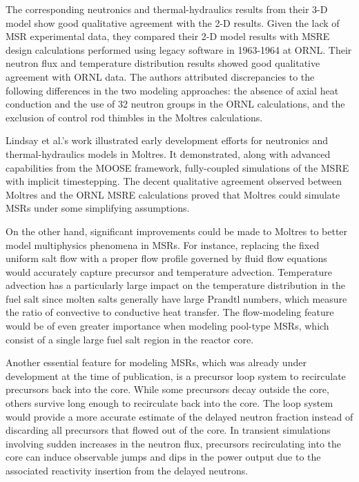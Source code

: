 The corresponding neutronics and thermal-hydraulics results from their 3-D model
show good qualitative agreement with the 2-D results. Given the lack of
\gls{MSR} experimental data, they compared their 2-D model results with
\gls{MSRE} design calculations performed using legacy software in 1963-1964 at
\gls{ORNL}. Their neutron flux and temperature distribution results showed good
qualitative agreement with \gls{ORNL} data. The authors attributed
discrepancies to the following differences in the two modeling approaches: the
absence of axial heat conduction and the use of 32 neutron groups in the
\gls{ORNL} calculations, and the exclusion of control rod thimbles in the
Moltres calculations.


Lindsay et al.'s work illustrated early development efforts for neutronics and thermal-hydraulics
models in Moltres. It demonstrated, along with advanced capabilities from the \gls{MOOSE}
framework, fully-coupled simulations of the \gls{MSRE} with implicit timestepping. The
decent qualitative agreement observed between Moltres and the \gls{ORNL}
\gls{MSRE} calculations proved that Moltres could simulate
\glspl{MSR} under some simplifying assumptions.

On the other hand, significant improvements could be made to Moltres to better
model multiphysics phenomena in \glspl{MSR}. For instance, replacing the
fixed uniform salt flow with a proper flow profile governed by fluid flow
equations would accurately capture precursor and temperature advection.
Temperature advection has a particularly large impact on the temperature
distribution in the fuel salt since molten salts generally have large Prandtl
numbers, which measure the ratio of convective to conductive heat transfer.
The flow-modeling feature would be of even greater importance when modeling
pool-type \glspl{MSR}, which consist of a single large fuel salt region in the
reactor core.

Another essential feature for modeling \glspl{MSR}, which was already under
development at the time of publication, is a precursor loop
system to recirculate precursors back into the core. While some precursors
decay outside the core, others survive long enough to recirculate back into the
core. The loop system would provide a more accurate estimate of the delayed
neutron fraction instead of discarding all precursors that flowed out of
the core. In transient simulations involving sudden increases in the neutron
flux, precursors recirculating into the core can induce observable jumps and
dips in the power output due to the associated reactivity insertion from the
delayed neutrons.

